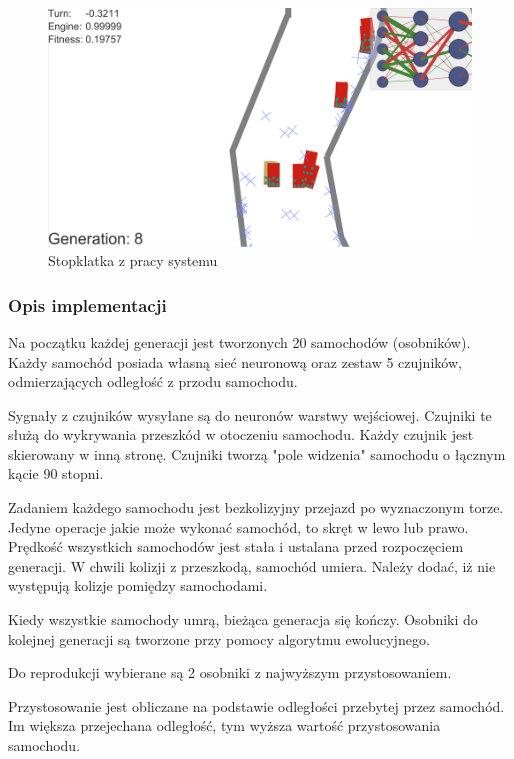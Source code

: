 \begin{figure}[h]
\begin{center}
\includegraphics[width=16cm]{resources/figures/samuelArtzDeepCars.png}
\caption{Stopklatka z pracy systemu}
\label{SamuelArtzDeepLearningCars}
\end{center}
\end{figure}

\subsubsection{Opis implementacji}
Na początku każdej generacji jest tworzonych 20 samochodów (osobników). \\
Każdy samochód posiada własną sieć neuronową oraz zestaw 5 czujników, odmierzających odległość z przodu samochodu.

Sygnały z czujników wysyłane są do neuronów warstwy wejściowej.
Czujniki te służą do wykrywania przeszkód w otoczeniu samochodu.
Każdy czujnik jest skierowany w inną stronę.
Czujniki tworzą "pole widzenia" samochodu o łącznym kącie 90 stopni.

Zadaniem każdego samochodu jest bezkolizyjny przejazd po wyznaczonym torze.
Jedyne operacje jakie może wykonać samochód, to skręt w lewo lub prawo.
Prędkość wszystkich samochodów jest stała i ustalana przed rozpoczęciem generacji.
W chwili kolizji z przeszkodą, samochód umiera.
Należy dodać, iż nie występują kolizje pomiędzy samochodami.

Kiedy wszystkie samochody umrą, bieżąca generacja się kończy.
Osobniki do kolejnej generacji są tworzone przy pomocy algorytmu ewolucyjnego.

Do reprodukcji wybierane są 2 osobniki z najwyższym przystosowaniem.

Przystosowanie jest obliczane na podstawie odległości przebytej przez samochód.
Im większa przejechana odległość, tym wyższa wartość przystosowania samochodu.

